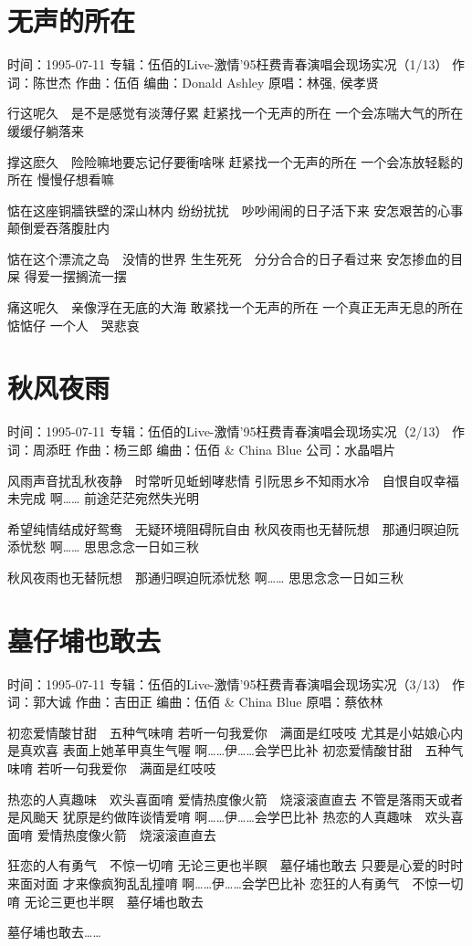 \documentclass[UTF8,a4paper,oneside,twocolumn,12pt]{ctexbook}
\newcommand{\infopair}[2]{\textbullet #1：#2}
\newcommand{\zc}[1][伍佰]{\infopair{作词}{#1}}
\newcommand{\zq}[1][伍佰]{\infopair{作曲}{#1}}
\newcommand{\bq}[1][伍佰]{\infopair{编曲}{#1}}
\newcommand{\zj}[1]{\infopair{专辑}{#1}}
\newcommand{\yc}[1]{\infopair{原唱}{#1}}
\newcommand{\sj}[1]{\infopair{时间}{#1}}
\newenvironment{info}{\begin{flushleft}\kaishu
	}
	{\end{flushleft}\normalsize\yahei\par}
\newenvironment{lyric}{
	}
{}
\begin{document}
\section{无声的所在}
\begin{info}
	\sj{1995-07-11}
	\zj{伍佰的Live-激情'95枉费青春演唱会现场实况（1/13）}
	\zc[陈世杰]
	\zq
	\bq[Donald Ashley]
	\yc{林强, 侯孝贤}
\end{info}
\begin{lyric}
	行这呢久　是不是感觉有淡薄仔累
	赶紧找一个无声的所在
	一个会冻喘大气的所在
	缓缓仔躺落来

	撑这麽久　险险嘛地要忘记仔要衝啥咪
	赶紧找一个无声的所在
	一个会冻放轻鬆的所在
	慢慢仔想看嘛

	惦在这座铜牆铁壁的深山林内
	纷纷扰扰　吵吵闹闹的日子活下来
	安怎艰苦的心事　颠倒爱吞落腹肚内

	惦在这个漂流之岛　没情的世界
	生生死死　分分合合的日子看过来
	安怎掺血的目屎
	得爱一摆搁流一摆

	痛这呢久　亲像浮在无底的大海
	敢紧找一个无声的所在
	一个真正无声无息的所在
	惦惦仔  一个人　哭悲哀
\end{lyric}

\section{秋风夜雨}
\begin{info}
	\sj{1995-07-11}
	\zj{伍佰的Live-激情'95枉费青春演唱会现场实况（2/13）}
	\zc[周添旺]
	\zq[杨三郎]
	\bq[伍佰 \& China Blue]
	\infopair{公司}{水晶唱片}
\end{info}
\begin{lyric}
	风雨声音扰乱秋夜静　时常听见蚯蚓哮悲情
	引阮思乡不知雨水冷　自恨自叹幸福未完成
	啊……  前途茫茫宛然失光明

	希望纯情结成好鸳鸯　无疑环境阻碍阮自由
	秋风夜雨也无替阮想　那通归暝迫阮添忧愁
	啊……  思思念念一日如三秋

	秋风夜雨也无替阮想　那通归暝迫阮添忧愁
	啊……  思思念念一日如三秋
\end{lyric}

\section{墓仔埔也敢去}
\begin{info}
	\sj{1995-07-11}
	\zj{伍佰的Live-激情'95枉费青春演唱会现场实况（3/13）}
	\zc[郭大诚]
	\zq[吉田正]
	\bq[伍佰 \& China Blue]
	\yc{蔡依林}
\end{info}
\begin{lyric}
	初恋爱情酸甘甜　五种气味唷
	若听一句我爱你　满面是红吱吱
	尤其是小姑娘心内是真欢喜
	表面上她革甲真生气喔
	啊……伊……会学巴比补
	初恋爱情酸甘甜　五种气味唷
	若听一句我爱你　满面是红吱吱

	热恋的人真趣味　欢头喜面唷
	爱情热度像火箭　烧滚滚直直去
	不管是落雨天或者是风颱天
	犹原是约做阵谈情爱唷
	啊……伊……会学巴比补
	热恋的人真趣味　欢头喜面唷
	爱情热度像火箭　烧滚滚直直去

	狂恋的人有勇气　不惊一切唷
	无论三更也半瞑　墓仔埔也敢去
	只要是心爱的时时来面对面
	才来像疯狗乱乱撞唷
	啊……伊……会学巴比补
	恋狂的人有勇气　不惊一切唷
	无论三更也半瞑　墓仔埔也敢去

	墓仔埔也敢去……
\end{lyric}
\end{document}
